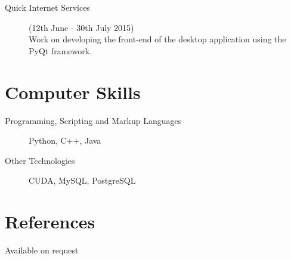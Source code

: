 \documentclass[margin,line,a4paper]{resume}
\begin{document}
\begin{resume}
\begin{description}
                \item[Quick Internet Services] (12th June - 30th July 2015)\\
                    Work on developing the front-end of the desktop application using the PyQt framework.
            \end{description}

        \section{\mysidestyle Computer Skills}
            \begin{description}
                \item [Programming, Scripting and Markup Languages] Python, C++, Java
                \item [Other Technologies] CUDA, MySQL, PostgreSQL
            \end{description}

        \section{\mysidestyle References}
            Available on request
    \end{resume}
\end{document}
